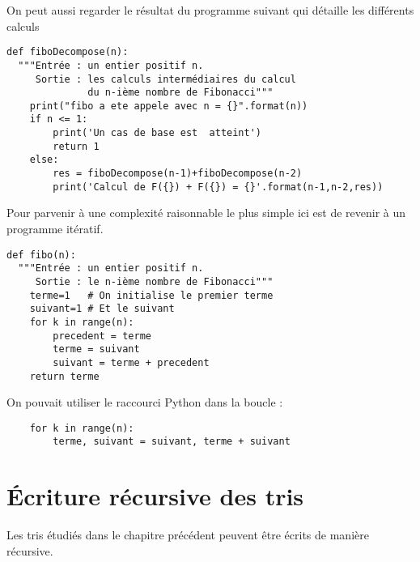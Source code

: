 On peut aussi regarder le résultat du programme suivant qui détaille les différents calculs
\begin{lstlisting}
def fiboDecompose(n):
  """Entrée : un entier positif n.
     Sortie : les calculs intermédiaires du calcul
              du n-ième nombre de Fibonacci"""
    print("fibo a ete appele avec n = {}".format(n))
    if n <= 1:
        print('Un cas de base est  atteint')
        return 1
    else:
        res = fiboDecompose(n-1)+fiboDecompose(n-2)
        print('Calcul de F({}) + F({}) = {}'.format(n-1,n-2,res))
\end{lstlisting}

\medskip

Pour parvenir à une complexité raisonnable le plus simple ici est de revenir à un programme itératif.
\begin{lstlisting}
def fibo(n):
  """Entrée : un entier positif n.
     Sortie : le n-ième nombre de Fibonacci"""
    terme=1   # On initialise le premier terme
    suivant=1 # Et le suivant
    for k in range(n):
        precedent = terme
        terme = suivant
        suivant = terme + precedent
    return terme
\end{lstlisting}
On pouvait utiliser le raccourci Python dans la boucle :
\begin{lstlisting}
    for k in range(n):
        terme, suivant = suivant, terme + suivant
\end{lstlisting}
\section{Écriture récursive des tris}
Les tris étudiés dans le chapitre précédent peuvent être écrits de manière récursive.


